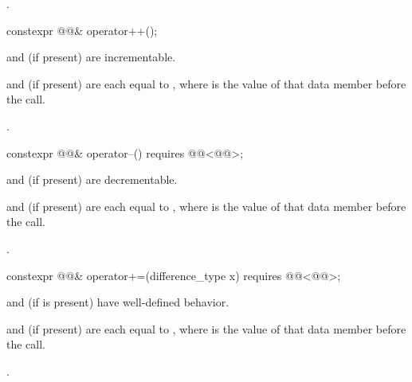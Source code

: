 \begin{itemdescr}
\pnum
\returns
{}.
\end{itemdescr}

%
\begin{itemdecl}
constexpr @@& operator++();
\end{itemdecl}

\begin{itemdescr}
\pnum
\expects
{} and  (if present) are incrementable.

\pnum
\ensures
{} and  (if present) are
each equal to ,
where  is the value of that data member before the call.

\pnum
\returns
{}.
\end{itemdescr}

%
\begin{itemdecl}
constexpr @@& operator--() requires @@<@@>;
\end{itemdecl}

\begin{itemdescr}
\pnum
\expects
{} and  (if present) are decrementable.

\pnum
\ensures
{} and  (if present) are
each equal to ,
where  is the value of that data member before the call.

\pnum
\returns
{}.
\end{itemdescr}

%
\begin{itemdecl}
constexpr @@& operator+=(difference_type x)
  requires @@<@@>;
\end{itemdecl}

\begin{itemdescr}
\pnum
\expects
{} and  (if  is present)
have well-defined behavior.

\pnum
\ensures
{} and  (if present) are
each equal to ,
where  is the value of that data member before the call.

\pnum
\returns
{}.
\end{itemdescr}

